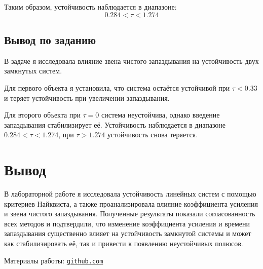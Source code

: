 \documentclass[a4paper,12pt]{article}
\begin{document}
	Таким образом, устойчивость наблюдается в диапазоне:
	\[
	0.284 < \tau < 1.274 
	\]
	
	\newpage
	\subsection{Вывод по заданию}
	В задаче я исследовала влияние звена чистого запаздывания на устойчивость
	двух замкнутых систем.
	
	Для первого объекта я установила, что система остаётся устойчивой при
	$\tau < 0.33$ и теряет устойчивость при увеличении запаздывания.
	
	Для второго объекта при $\tau = 0$ система неустойчива, однако введение
	запаздывания стабилизирует её. Устойчивость наблюдается в диапазоне
	$0.284 < \tau < 1.274$, при $\tau > 1.274$ устойчивость снова теряется.
	


	
	
	

	\newpage
	\section{Вывод}
	
	В лабораторной работе я исследовала устойчивость линейных систем с помощью критериев Найквиста, а также проанализировала влияние коэффициента усиления и звена чистого запаздывания. Полученные результаты показали согласованность всех методов и подтвердили, что изменение коэффициента усиления и времени 
	запаздывания существенно влияет на устойчивость замкнутой системы 
	и может как стабилизировать её, так и привести к появлению 
	неустойчивых полюсов.
	
	

	Материалы работы: \href{https://github.com/decadeos/ITMO/tree/master/3_course/lsau/lab6}{\texttt{github.com}}
	
	
	
	
\end{document}
